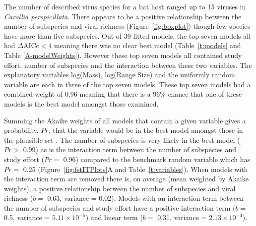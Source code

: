 The number of described virus species for a bat host ranged up to 15 viruses in \emph{Carollia perspicillata}.
There appears to be a positive relationship between the number of subspecies and viral richness (Figure~\ref{fig:boxplot}) though few species have more than five subspecies. 
Out of 39 fitted models, the top seven models all had $\Delta\text{AICc} < 4$ meaning there was no clear best model (Table~\ref{t:models} and Table \ref{A-modelWeights}).
However these top seven models all contained study effort, number of subspecies and the interaction between these two variables.
The explanatory variables log(Mass), log(Range Size) and the uniformly random variable are each in three of the top seven models.
These top seven models had a combined weight of 0.96 meaning that there is a 96\% chance that one of these models is the best model amongst those examined.



Summing the Akaike weights of all models that contain a given variable gives a probability, $Pr$, that the variable would be in the best model amongst those in the plausible set \cite{whittingham2006we}.
The number of subspecies is very likely in the best model ($Pr > $ 0.99) as is the interaction term between the number of subspecies and study effort ($Pr = $ 0.96) compared to the benchmark random variable which has $Pr = $ 0.25 (Figure~\ref{fig:fstITPlots}A and Table~\ref{t:variables}).
When models with the interaction term are removed there is, on average (mean weighted by Akaike weights), a positive relationship between the number of subspecies and viral richness ($b = $ 0.63, variance = 0.02).
Models with an interaction term between the number of subspecies and study effort have a positive interaction term ($b = $ 0.5, variance = \ensuremath{5.11\times 10^{-5}}) and linear term ($b = $ 0.31, variance = \ensuremath{2.13\times 10^{-4}}).








